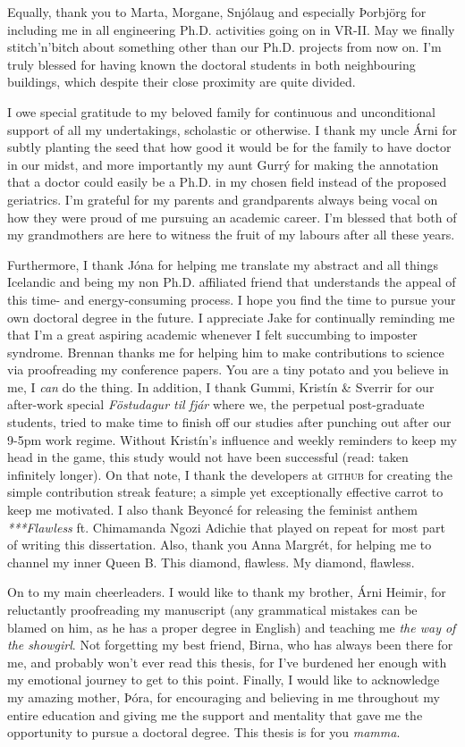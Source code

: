Equally, thank you to Marta, Morgane, Snjólaug and especially Þorbjörg for 
including me in all engineering Ph.D. activities going on in VR-II. 
May we finally stitch'n'bitch about something other than our Ph.D. projects 
from now on.  
I'm truly blessed for having known the doctoral students in both neighbouring 
buildings, which despite their close proximity are quite divided.

I owe special gratitude to my beloved family for continuous and unconditional 
support of all my undertakings, scholastic or otherwise. 
I thank my uncle Árni for subtly planting the seed that how good it would be 
for the family to have doctor in our midst, and more importantly my aunt Gurrý 
for making the annotation that a doctor could easily be a Ph.D. in my chosen 
field instead of the proposed geriatrics.
I'm grateful for my parents and grandparents always being vocal on how they 
were proud of me pursuing an academic career. I'm blessed that both of my 
grandmothers are here to witness the fruit of my labours after all these years. 

Furthermore, I thank Jóna for helping me translate my abstract and all things 
Icelandic and being my non Ph.D. affiliated friend that understands the appeal 
of this time- and energy-consuming process. I hope you find the time to pursue 
your own doctoral degree in the future.
I appreciate Jake for continually reminding me that I'm a great aspiring 
academic whenever I felt succumbing to imposter syndrome.
Brennan thanks me for helping him to make contributions to science via 
proofreading my conference papers. You are a tiny potato and you believe in me, 
I \emph{can} do the thing.
In addition, I thank Gummi, Kristín \& Sverrir for our after-work special 
\emph{Föstudagur til fjár} where we, the perpetual post-graduate students, 
tried to make time to finish off our studies after punching out after our 9-5pm 
work regime. 
Without Kristín's influence and weekly reminders to keep my head in the game, 
this study would not have been successful (read: taken infinitely longer). 
On that note, I thank the developers at \textsc{github} for creating the simple 
contribution streak feature; a simple yet exceptionally effective carrot to 
keep me motivated.
I also thank Beyoncé for releasing the feminist anthem \emph{***Flawless} ft. 
Chimamanda Ngozi Adichie that played on repeat for most part of writing this 
dissertation. Also, thank you Anna Margrét, for helping me to channel my inner 
Queen B. This diamond, flawless. My diamond, flawless.

On to my main cheerleaders. 
I would like to thank my brother, Árni Heimir, for reluctantly proofreading my 
manuscript (any grammatical mistakes can be blamed on him, as he has a proper 
degree in English) and teaching me \emph{the way of the showgirl}.
Not forgetting my best friend, Birna, who has always been there for me, and 
probably won't ever read this thesis, for I've burdened her enough with my 
emotional journey to get to this point. 
Finally, I would like to acknowledge my amazing mother, Þóra, for encouraging 
and believing in me throughout my entire education and giving me the support 
and mentality that gave me the opportunity to pursue a doctoral degree. This 
thesis is for you \emph{mamma}.

